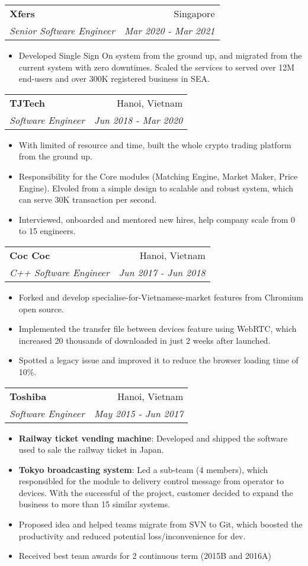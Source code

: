 \documentclass[letterpaper,11pt]{article}
\makeatletter
\newcommand{\resumeItem}[2]{
  \item\small{
    \textbf{#1}{: #2 \vspace{-2pt}}
  }
}
\newcommand{\resumeItemWithoutHighlight}[1]{
  \item\small{
    {#1 \vspace{-2pt}}
  }
}
\newcommand{\resumeSubheading}[4]{
  \vspace{-1pt}\item
    \begin{tabular*}{0.97\textwidth}[t]{l@{\extracolsep{\fill}}r}
      \textbf{#1} & #2 \\
      \textit{\small#3} & \textit{\small #4} \\
    \end{tabular*}\vspace{-5pt}
}
\newcommand{\resumeItemListStart}{\begin{itemize}}
\newcommand{\resumeItemListEnd}{\end{itemize}\vspace{-5pt}}
\makeatother
\begin{document}
    \resumeSubheading
      {Xfers}{Singapore}
      {Senior Software Engineer}{Mar 2020 - Mar 2021}
      \resumeItemListStart
        \resumeItemWithoutHighlight
          {Developed Single Sign On system from the ground up, and migrated from the current system with zero downtimes. Scaled the services to served over 12M end-users and over 300K registered business in SEA.}
      \resumeItemListEnd

    \resumeSubheading
      {TJTech}{Hanoi, Vietnam}
      {Software Engineer}{Jun 2018 - Mar 2020}
      \resumeItemListStart
        \resumeItemWithoutHighlight
          {With limited of resource and time, built the whole crypto trading platform from the ground up.}
        \resumeItemWithoutHighlight
          {Responsibility for the Core modules (Matching Engine, Market Maker, Price Engine). Elvoled from a simple design to scalable and robust system, which can serve 30K transaction per second.}
        \resumeItemWithoutHighlight
          {Interviewed, onboarded and mentored new hires, help company scale from 0 to 15 engineers.}
      \resumeItemListEnd

    \resumeSubheading
      {Coc Coc}{Hanoi, Vietnam}
      {C++ Software Engineer}{Jun 2017 - Jun 2018}
      \resumeItemListStart
        \resumeItemWithoutHighlight
          {Forked and develop specialise-for-Vietnamese-market features from Chromium open source.}
        \resumeItemWithoutHighlight
          {Implemented the transfer file between devices feature using WebRTC, which increased 20 thousands of downloaded in just 2 weeks after launched.}
        \resumeItemWithoutHighlight
          {Spotted a legacy issue and improved it to reduce the browser loading time of 10\%.}
      \resumeItemListEnd

    \resumeSubheading
      {Toshiba}{Hanoi, Vietnam}
      {Software Engineer}{May 2015 - Jun 2017}
      \resumeItemListStart
        \resumeItem{Railway ticket vending machine}
          {Developed and shipped the software used to sale the railway ticket in Japan.}
        \resumeItem{Tokyo broadcasting system}
          {Led a sub-team (4 members), which responsibled for the module to delivery control message from operator to devices. With the successful of the project, customer decided to expand the business to more than 15 similar systems.}
        \resumeItemWithoutHighlight
          {Proposed idea and helped teams migrate from SVN to Git, which boosted the productivity and reduced potential loss/inconvenience for dev.}
        \resumeItemWithoutHighlight
          {Received best team awards for 2 continuous term (2015B and 2016A)}
      \resumeItemListEnd
\end{document}
